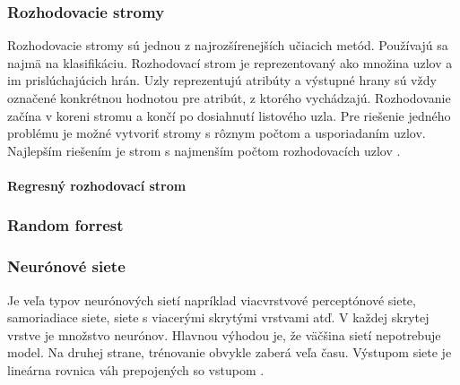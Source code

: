 \documentclass[a4paper,slovak,12pt,appendix]{article}
\begin{document}

\subsubsection{Rozhodovacie stromy}
Rozhodovacie stromy sú jednou z najrozšírenejších učiacich metód. Používajú sa
najmä na klasifikáciu. Rozhodovací strom je reprezentovaný ako množina uzlov
a im prislúchajúcich hrán. Uzly reprezentujú atribúty a výstupné hrany sú vždy
označené konkrétnou hodnotou pre atribút, z ktorého vychádzajú. Rozhodovanie
začína v koreni stromu a končí po dosiahnutí listového uzla. Pre riešenie
jedného problému je možné vytvoriť stromy s rôznym počtom a usporiadaním uzlov.
Najlepším riešením je strom s najmenším počtom rozhodovacích
uzlov \cite{Merz1998}.

\paragraph{Regresný rozhodovací strom}


\subsubsection{Random forrest}


\subsubsection{Neurónové siete}
Je veľa typov neurónových sietí napríklad viacvrstvové perceptónové siete,
samoriadiace siete, siete s viacerými skrytými vrstvami atď. V každej skrytej
vrstve je množstvo neurónov. Hlavnou výhodou je, že väčšina sietí nepotrebuje
model. Na druhej strane, trénovanie obvykle zaberá veľa času. Výstupom siete
je lineárna rovnica váh prepojených so vstupom \cite{KumarSingh2013}.

\end{document}
